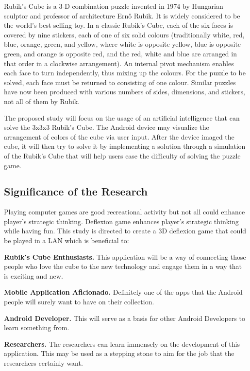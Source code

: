 
Rubik's Cube is a 3-D combination puzzle invented in 1974 by Hungarian sculptor and professor of architecture Ernő Rubik.  It is widely considered to be the world's best-selling toy.
In a classic Rubik's Cube, each of the six faces is covered by nine stickers, each of one of six solid colours (traditionally white, red, blue, orange, green, and yellow, where white is opposite yellow, blue is opposite green, and orange is opposite red, and the red, white and blue are arranged in that order in a clockwise arrangement).  An internal pivot mechanism enables each face to turn independently, thus mixing up the colours.  For the puzzle to be solved, each face must be returned to consisting of one colour.  Similar puzzles have now been produced with various numbers of sides, dimensions, and stickers, not all of them by Rubik.

The proposed study will focus on the usage of an artificial intelligence that can solve the 3x3x3 Rubik’s Cube.  The Android device may visualize the arrangement of colors of the cube via user input.  After the device imaged the cube, it will then try to solve it by implementing a solution through a simulation of the Rubik’s Cube that will help users ease the difficulty of solving the puzzle game.


\subsection{Significance of the Research}
\vspace{-3ex}
Playing computer games are good recreational activity but not all could enhance player’s strategic thinking. Deflexion game enhances player’s strategic thinking while having fun. This study is directed to create a 3D deflexion game that could be played in a LAN which is beneficial to:

\textbf{Rubik’s Cube Enthusiasts.} This application will be a way of connecting those people who love the cube to the new technology and engage them in a way that is exciting and new.

\textbf{Mobile Application Aficionado.} Definitely one of the apps that the Android people will surely want to have on their collection.

\textbf{Android Developer.} This will serve as a basis for other Android Developers to learn something from.

\textbf{Researchers.} The researchers can learn immensely on the development of this application.  This may be used as a stepping stone to aim for the job that the researchers certainly want.  


